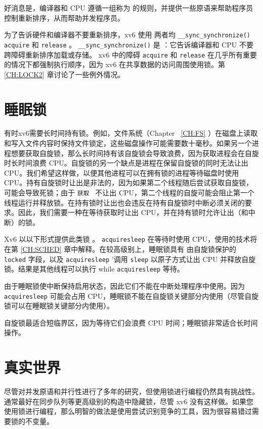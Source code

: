 \documentclass[UTF8]{article}
\begin{document}
好消息是，编译器和 CPU 遵循一组称为        的规则，并提供一些原语来帮助程序员控制重新排序，从而帮助并发程序员。  

为了告诉硬件和编译器不要重新排序，xv6 使用
 两者均    \lstinline{__sync_synchronize()}   
    \lstinline{acquire}           和
    \lstinline{release}           。
    \lstinline{__sync_synchronize()}    是        ：它告诉编译器和 CPU 不要跨障碍重新排序加载或存储。 xv6 中的障碍
    \lstinline{acquire}    和
    \lstinline{release}    在几乎所有重要的情况下都强制执行顺序，因为 xv6 在共享数据的访问周围使用锁。第~    \ref{CH:LOCK2}    章讨论了一些例外情况。
    \section{睡眠锁  }     

有时xv6需要长时间持有锁。例如，文件系统（Chapter~    \ref{CH:FS}   ）在磁盘上读取和写入文件内容时保持文件锁定，这些磁盘操作可能需要数十毫秒。如果另一个进程想要获取自旋锁，那么长时间持有该自旋锁会导致浪费，因为获取进程会在自旋时长时间浪费 CPU。自旋锁的另一个缺点是进程在保留自旋锁的同时无法让出 CPU。我们希望这样做，以便其他进程可以在拥有锁的进程等待磁盘时使用 CPU。持有自旋锁时让出是非法的，因为如果第二个线程随后尝试获取自旋锁，可能会导致死锁；由于  {    \tt    获取   }  不让出 CPU，第二个线程的自旋可能会阻止第一个线程运行并释放锁。在持有锁时让出也会违反在持有自旋锁时中断必须关闭的要求。因此，我们需要一种在等待获取时让出 CPU，并在持有锁时允许让出（和中断）的锁。  

Xv6 以以下形式提供此类锁
        。
    \lstinline{acquiresleep}   
        在等待时使用 CPU，使用的技术将在第    \ref{CH:SCHED}    章中解释。在较高级别上，睡眠锁具有
 由自旋锁保护的    \lstinline{locked}    字段，以及
    \lstinline{acquiresleep}    '调用
    \lstinline{sleep}    以原子方式让出 CPU 并释放自旋锁。结果是其他线程可以执行 while
    \lstinline{acquiresleep}    等待。  

由于睡眠锁使中断保持启用状态，因此它们不能在中断处理程序中使用。因为
    \lstinline{acquiresleep}    可能会占用 CPU，睡眠锁不能在自旋锁关键部分内使用（尽管自旋锁可以在睡眠锁关键部分内使用）。  

自旋锁最适合短临界区，因为等待它们会浪费 CPU 时间；睡眠锁非常适合长时间操作。
    \section{真实世界  }    尽管对并发原语和并行性进行了多年的研究，但使用锁进行编程仍然具有挑战性。通常最好在同步队列等更高级别的构造中隐藏锁，尽管 xv6 没有这样做。如果您使用锁进行编程，那么明智的做法是使用尝试识别竞争的工具，因为很容易错过需要锁的不变量。  
\end{document}
